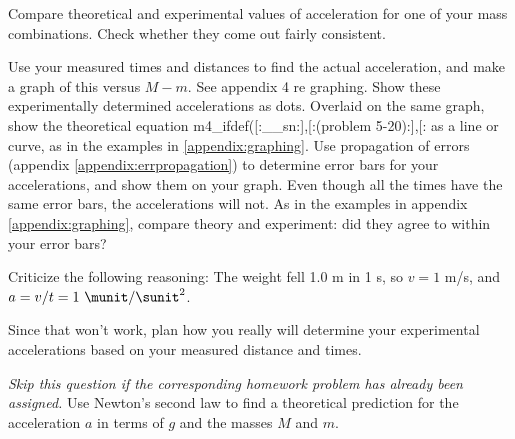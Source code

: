 \selfcheck

Compare theoretical and experimental values of
acceleration for one of your mass combinations.
Check whether they come out fairly consistent.

\analysis

Use your measured times and distances to find the actual
acceleration, and make a graph of this versus $M-m$. 
See appendix 4 re graphing.
Show
these experimentally determined accelerations as dots.
Overlaid on the same graph, show the theoretical
equation %
m4_ifdef([:__sn:],[:(problem 5-20):],[:%
as a line or curve, as in the examples in \ref{appendix:graphing}.
Use propagation of errors (appendix \ref{appendix:errpropagation}) to determine error bars 
for your accelerations, and show them on your graph.
Even though all the times have the same error bars, the accelerations will not.
As in the examples in appendix \ref{appendix:graphing}, compare theory and
experiment: did they agree
to within your error bars?

\prelab

\prelabquestion Criticize the following reasoning: 
The weight fell 1.0
m in 1 s, so $v=1$ m/s, and $a=v/t=1\ \munit/\sunit^2$.

\prelabquestion Since that won't work, plan how you really will
determine your experimental accelerations based on your
measured distance and times.

\prelabquestion   \emph{Skip this question if the corresponding homework problem
has already been assigned.} Use Newton's second law to find a theoretical
prediction for the acceleration $a$ in terms of $g$ and the masses $M$ and $m$.
